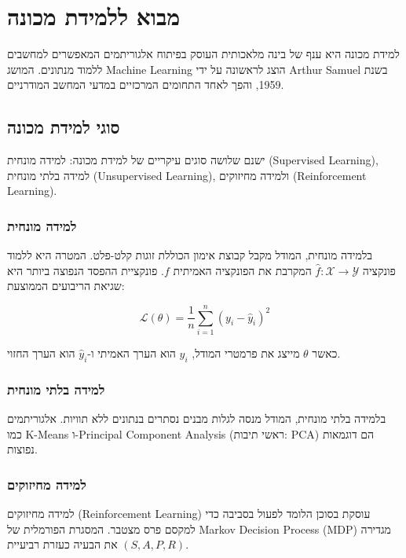 \chapter{מבוא ללמידת מכונה}

למידת מכונה היא ענף של בינה מלאכותית העוסק בפיתוח אלגוריתמים המאפשרים למחשבים ללמוד מנתונים.
המושג \textenglish{Machine Learning} הוצג לראשונה על ידי \textenglish{Arthur Samuel} בשנת 1959,
והפך לאחד התחומים המרכזיים במדעי המחשב המודרניים.

\section{סוגי למידת מכונה}

ישנם שלושה סוגים עיקריים של למידת מכונה: למידה מונחית (\textenglish{Supervised Learning}),
למידה בלתי מונחית (\textenglish{Unsupervised Learning}), ולמידה מחיזוקים
(\textenglish{Reinforcement Learning}).

\subsection{למידה מונחית}

בלמידה מונחית, המודל מקבל קבוצת אימון הכוללת זוגות קלט-פלט. המטרה היא ללמוד פונקציה
\(\hat{f}: \mathcal{X} \to \mathcal{Y}\) המקרבת את הפונקציה האמיתית \(f\).
פונקציית ההפסד הנפוצה ביותר היא שגיאת הריבועים הממוצעת:

\begin{equation}
    \mathcal{L}(\theta) = \frac{1}{n} \sum_{i=1}^{n} \left( y_i - \hat{y}_i \right)^2
\end{equation}

כאשר \(\theta\) מייצג את פרמטרי המודל, \(y_i\) הוא הערך האמיתי ו-\(\hat{y}_i\) הוא הערך החזוי.

\subsection{למידה בלתי מונחית}

בלמידה בלתי מונחית, המודל מנסה לגלות מבנים נסתרים בנתונים ללא תוויות. אלגוריתמים כמו
\textenglish{K-Means} ו-\textenglish{Principal Component Analysis} (ראשי תיבות: \textenglish{PCA})
הם דוגמאות נפוצות.

\subsection{למידה מחיזוקים}

למידה מחיזוקים (\textenglish{Reinforcement Learning}) עוסקת בסוכן הלומד לפעול בסביבה
כדי למקסם פרס מצטבר. המסגרת הפורמלית של \textenglish{Markov Decision Process} (\textenglish{MDP})
מגדירה את הבעיה כעזרת רביעיית \((S, A, P, R)\).

